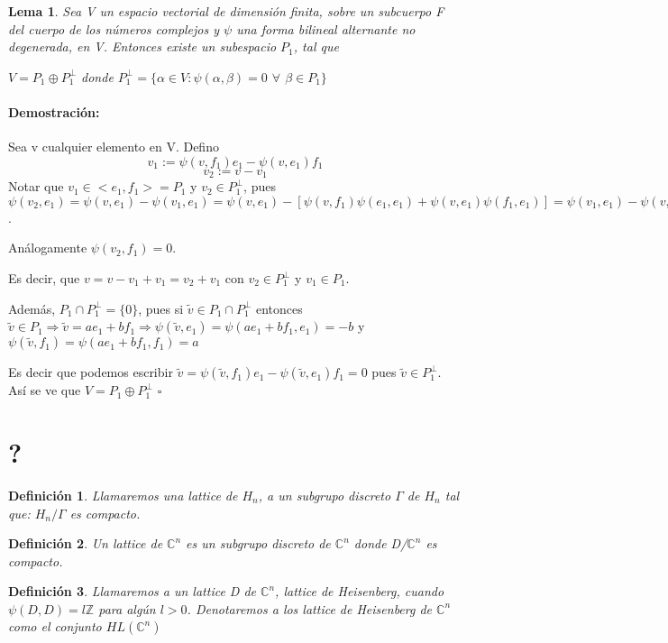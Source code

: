 \documentclass[12pt]{article}
\newtheorem{lemma}{Lema}
\newtheorem{definition}{Definición}
\newenvironment{proof}{\paragraph{Demostración:}}{\hfill$\square$}
\begin{document}
\begin{lemma}
 Sea V un espacio vectorial de dimensión finita, sobre un subcuerpo F del cuerpo de los números complejos y
 $\psi$ una forma bilineal alternante no degenerada, en V.
 Entonces existe un subespacio $P_1$, tal que 
 
 $V = P_1 \oplus P_1^{\bot}$
 donde $P_1^{\bot}= \{ \alpha \in V: \psi(\alpha,\beta)=0$  $\forall$  $\beta \in P_1 \} $
 \end{lemma}
 
 \begin{proof}
 Sea v cualquier elemento en V.
 Defino 
 $$v_1:=\psi(v,f_1)e_1-\psi(v,e_1)f_1$$
 $$v_2:=v-v_1$$
 Notar que $v_1 \in <e_1,f_1>=P_1$ y $v_2 \in P_1^{\bot}$, pues 
 $\psi(v_2,e_1)=\psi(v,e_1)-\psi(v_1,e_1)=\psi (v,e_1)-[\psi(v,f_1) \psi(e_1,e_1) + \psi(v,e_1) \psi(f_1,e_1)]=
 \psi(v_1,e_1)- \psi(v,e_1)=0$.
 
 Análogamente $\psi(v_2,f_1)=0$.
 
 Es decir, que $v=v-v_1+v_1=v_2 + v_1$ con $v_2 \in P_1^{\bot}$ y $v_1 \in P_1$.
 
 Además, $P_1  \cap P_1^{\bot} = \{0\}$, pues si  $\tilde{v} \in  P_1 \cap P_1^{\bot}$ entonces
 $\tilde{v} \in P_1 \Rightarrow \tilde{v}=a e_1 + b f_1 \Rightarrow 
 \psi(\tilde{v},e_1)=\psi(a e_1 + b f_1,e_1)=-b$ y $\psi(\tilde{v},f_1)=\psi(a e_1 + b f_1,f_1)=a $
 
 Es decir que podemos escribir $\tilde{v}=\psi(\tilde{v},f_1) e_1 - \psi(\tilde{v},e_1) f_1=0$ pues 
 $\tilde{v} \in P_1^{\bot}.$
 Así se ve que $V = P_1 \oplus P_1^{\bot}$ 
\end{proof} 



\section{?}

\begin{definition}
 Llamaremos una lattice de $H_n$, a un subgrupo discreto $\Gamma$ de $H_n$ tal que:
 $H_n/\Gamma$ es compacto.
\end{definition}

\begin{definition}
 Un lattice de $\mathbb{C}^n$ es un subgrupo discreto de $\mathbb{C}^n$ donde D/$\mathbb{C}^n$ es compacto.
\end{definition}


\begin{definition}
 Llamaremos a un lattice D de $\mathbb{C}^n$, lattice de Heisenberg, cuando $\psi(D,D)=l \mathbb{Z} $ para algún $l > 0$.
 Denotaremos a los lattice de Heisenberg de $\mathbb{C}^n$ como el conjunto $HL(\mathbb{C}^n)$
\end{definition}
\end{document}
